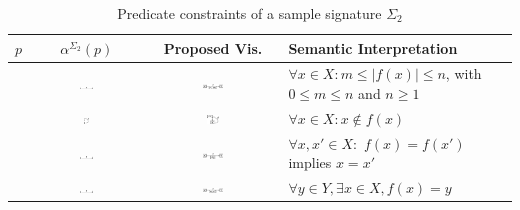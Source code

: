 \documentclass{eceasst}
\begin{document}
\begin{table}[h]\label{tbl:predicateconstraint}
 \caption{Predicate constraints of a sample signature $\Sigma_2$}
 \begin{center}
    \begin{tabular}{| l | c | c | p{6cm} | }    
    \hline
    $p$ & $\alpha^{\Sigma_2}(p)$ & Proposed Vis. & Semantic Interpretation \\ \hline
    [mult(n,m)] & \includegraphics[width=0.13\textwidth]{mult.pdf} & \includegraphics[width=0.16\textwidth]{mult_vis.pdf} & $\forall x \in X : m \leq |f(x)| \leq n$, 
																		  with $0 \leq m \leq n$ and $n \geq 1$ \\ \hline
    [irreflexive] & \includegraphics[width=0.05\textwidth]{irr_arity.pdf} & \includegraphics[width=0.09\textwidth]{irr_vis.pdf} & $\forall x \in X : x \notin f(x)$ \\ \hline
    [injective] & \includegraphics[width=0.13\textwidth]{mult.pdf} & \includegraphics[width=0.16\textwidth]{inj_vis.pdf} & $\forall x,x' \in X :$ $f(x) = f(x')$ implies $x = x'$ \\ \hline
    [surjective] & \includegraphics[width=0.13\textwidth]{mult.pdf} & \includegraphics[width=0.16\textwidth]{surj_vis.pdf} & $\forall y \in Y, \exists x \in X, f(x) = y $ \\ \hline

\end{tabular}
\end{center}
\end{table}
\end{document}
